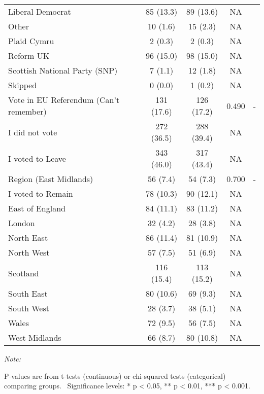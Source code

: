 \begin{table}
\begin{threeparttable}
\begin{tabular}[t]{lcccc}
Liberal Democrat & 85 (13.3) & 89 (13.6) & NA & \\
Other & 10 (1.6) & 15 (2.3) & NA & \\
Plaid Cymru & 2 (0.3) & 2 (0.3) & NA & \\
\addlinespace
Reform UK & 96 (15.0) & 98 (15.0) & NA & \\
Scottish National Party (SNP) & 7 (1.1) & 12 (1.8) & NA & \\
Skipped & 0 (0.0) & 1 (0.2) & NA & \\
Vote in EU Referendum (Can’t remember) & 131 (17.6) & 126 (17.2) & 0.490 & -\\
I did not vote & 272 (36.5) & 288 (39.4) & NA & \\
\addlinespace
I voted to Leave & 343 (46.0) & 317 (43.4) & NA & \\
Region (East Midlands) & 56 (7.4) & 54 (7.3) & 0.700 & -\\
I voted to Remain & 78 (10.3) & 90 (12.1) & NA & \\
East of England & 84 (11.1) & 83 (11.2) & NA & \\
London & 32 (4.2) & 28 (3.8) & NA & \\
\addlinespace
North East & 86 (11.4) & 81 (10.9) & NA & \\
North West & 57 (7.5) & 51 (6.9) & NA & \\
Scotland & 116 (15.4) & 113 (15.2) & NA & \\
South East & 80 (10.6) & 69 (9.3) & NA & \\
South West & 28 (3.7) & 38 (5.1) & NA & \\
\addlinespace
Wales & 72 (9.5) & 56 (7.5) & NA & \\
West Midlands & 66 (8.7) & 80 (10.8) & NA & \\
\bottomrule
\end{tabular}
\begin{tablenotes}
\item \textit{Note: } 
\item P-values are from t-tests (continuous) or chi-squared tests (categorical) comparing groups. \ Significance levels: * p < 0.05, ** p < 0.01, *** p < 0.001.
\end{tablenotes}
\end{threeparttable}
\end{table}
